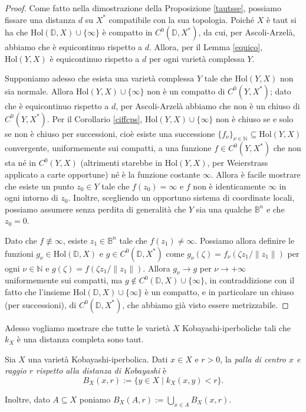 \begin{proof}
    Come fatto nella dimostrazione della Proposizione \ref{tautsse}, possiamo fissare una distanza $d$ su $X^*$ compatibile con la sua topologia. Poiché $X$ è taut si ha che $\text{Hol}(\mathbb{D},X)\cup\{\infty\}$ è compatto in $C^0(\mathbb{D},X^*)$, da cui, per Ascoli-Arzelà, abbiamo che è equicontinuo rispetto a $d$. Allora, per il Lemma \ref{equico}, $\text{Hol}(Y,X)$ è equicontinuo rispetto a $d$ per ogni varietà complessa $Y$.

    Supponiamo adesso che esista una varietà complessa $Y$ tale che $\text{Hol}(Y,X)$ non sia normale. Allora $\text{Hol}(Y,X)\cup\{\infty\}$ non è un compatto di $C^0(Y,X^*)$; dato che è equicontinuo rispetto a $d$, per Ascoli-Arzelà abbiamo che non è un chiuso di $C^0(Y,X^*)$. Per il Corollario \ref{ciffcps}, $\text{Hol}(Y,X)\cup\{\infty\}$ non è chiuso se e solo se non è chiuso per successioni, cioè esiste una successione $\{f_\nu\}_{\nu\in\mathbb{N}}\subseteq \text{Hol}(Y,X)$ convergente, uniformemente sui compatti, a una funzione $f\in C^0(Y,X^*)$ che non sta né in $C^0(Y,X)$ (altrimenti starebbe in $\text{Hol}(Y,X)$, per Weierstrass applicato a carte opportune) né è la funzione costante $\infty$. Allora è facile mostrare che esiste un punto $z_0\in Y$ tale che $f(z_0)=\infty$ e $f$ non è identicamente $\infty$ in ogni intorno di $z_0$. Inoltre, scegliendo un opportuno sistema di coordinate locali, possiamo assumere senza perdita di generalità che $Y$ sia una qualche $\mathbb{B}^n$ e che $z_0=0$.

    Dato che $f\not\equiv\infty$, esiste $z_1\in\mathbb{B}^n$ tale che $f(z_1)\not=\infty$. Possiamo allora definire le funzioni $g_\nu\in\text{Hol}(\mathbb{D},X)$ e $g\in C^0(\mathbb{D},X^*)$ come $g_\nu(\zeta)=f_\nu(\zeta z_1/\|z_1\|)$ per ogni $\nu\in\mathbb{N}$ e $g(\zeta)=f(\zeta z_1/\|z_1\|)$. Allora $g_\nu\longrightarrow g$ per $\nu\longrightarrow+\infty$ uniformemente sui compatti, ma $g\not\in C^0(\mathbb{D},X)\cup\{\infty\}$, in contraddizione con il fatto che l'insieme $\text{Hol}(\mathbb{D},X)\cup\{\infty\}$ è un compatto, e in particolare un chiuso (per successioni), di $C^0(\mathbb{D},X^*)$, che abbiamo già visto essere metrizzabile.
\end{proof}

Adesso vogliamo mostrare che tutte le varietà $X$ Kobayashi-iperboliche tali che $k_X$ è una distanza completa sono taut.

\begin{defn}
    Sia $X$ una varietà Kobayashi-iperbolica. Dati $x\in X$ e $r>0$, la \textit{palla di centro $x$ e raggio $r$ rispetto alla distanza di Kobayashi} è
    $$B_X(x,r):=\{y\in X\mid k_X(x,y)<r\}.$$

    Inoltre, dato $A\subseteq X$ poniamo $B_X(A,r):=\displaystyle\bigcup_{x\in A} B_X(x,r)$.
\end{defn}

